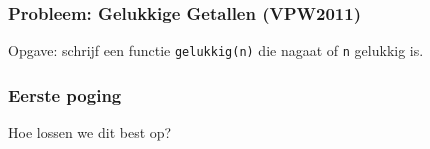 \begin{frame}
  \frametitle{Probleem: Gelukkige Getallen (VPW2011)}
  \begin{center} \Large
    Opgave: schrijf een functie {\tt gelukkig(n)} die nagaat
    of {\tt n} gelukkig is.
  \end{center}
\end{frame}

\begin{frame}
  \frametitle{Eerste poging}
\end{frame}

{
\newcommand{\drawgraph}[1]{{
  \let\activenode#1
  \foreach[count=\i] \c in {5,25,29,85} { 
    \pgfmathparse{\i*1.25}\let\x\pgfmathresult
    \pgfmathparse{ifthenelse(equal(\i,\activenode),"selected node","node")}\let\s\pgfmathresult
    \node[\s] (node \i) at (\x,0) {\c};
  }
  \foreach[count=\i] \c in {89,145,42,20,4,16,37,58} {
    \pgfmathparse{int(\i+4)}\let\j\pgfmathresult
    \pgfmathparse{180-360/8*(\i-1)}\let\angle\pgfmathresult
    \pgfmathparse{ifthenelse(equal(\j,\activenode),"selected node","node")}\let\s\pgfmathresult
    \node[\s,xshift=8.25cm] (node \j) at (\angle:2cm) {\c};
  }
  \foreach \i in {1,...,11} {
    \pgfmathparse{int(\i+1)}\let\j\pgfmathresult
    \draw[arrow] (node \i) to [bend left=30] (node \j);
  }
  \draw[arrow] (node 12) to [bend left=30] (node 5);
}}

\begin{frame}
  \begin{center}
  \end{center}
\end{frame}
}

\begin{frame}
  \begin{center} \Large
    Hoe lossen we dit best op?
  \end{center}
\end{frame}


